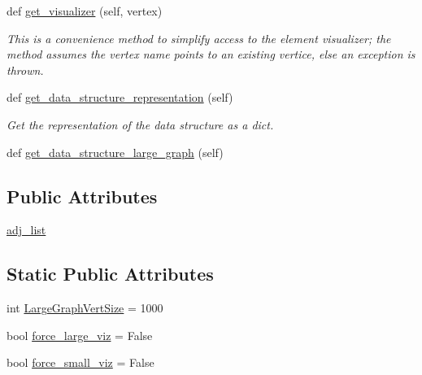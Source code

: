 \begin{DoxyCompactItemize}
def \hyperlink{classbridges_1_1graph__adj__list_1_1_graph_adj_list_ad63fce416ec0fdfd99d05e6236807fd8}{get\+\_\+visualizer} (self, vertex)
\begin{DoxyCompactList}\small\item\em This is a convenience method to simplify access to the element visualizer; the method assumes the vertex name points to an existing vertice, else an exception is thrown. \end{DoxyCompactList}\item 
def \hyperlink{classbridges_1_1graph__adj__list_1_1_graph_adj_list_a20ea8a6a1aa03a82223a59474037b3e3}{get\+\_\+data\+\_\+structure\+\_\+representation} (self)
\begin{DoxyCompactList}\small\item\em Get the representation of the data structure as a dict. \end{DoxyCompactList}\item 
def \hyperlink{classbridges_1_1graph__adj__list_1_1_graph_adj_list_aaffde74237de001232e0996a8c64ab82}{get\+\_\+data\+\_\+structure\+\_\+large\+\_\+graph} (self)
\end{DoxyCompactItemize}
\subsection*{Public Attributes}
\begin{DoxyCompactItemize}
\item 
\hyperlink{classbridges_1_1graph__adj__list_1_1_graph_adj_list_ad39dbb3db39a3ffc145c372e6996443c}{adj\+\_\+list}
\end{DoxyCompactItemize}
\subsection*{Static Public Attributes}
\begin{DoxyCompactItemize}
\item 
int \hyperlink{classbridges_1_1graph__adj__list_1_1_graph_adj_list_a093a64ead793e0bd3b1ce4e3456665c9}{Large\+Graph\+Vert\+Size} = 1000
\item 
bool \hyperlink{classbridges_1_1graph__adj__list_1_1_graph_adj_list_aa9f4209af428473fd2d6952a74eb22b9}{force\+\_\+large\+\_\+viz} = False
\item 
bool \hyperlink{classbridges_1_1graph__adj__list_1_1_graph_adj_list_a27900e6bb5504036ccf5ec2e4d301ddb}{force\+\_\+small\+\_\+viz} = False
\end{DoxyCompactItemize}


